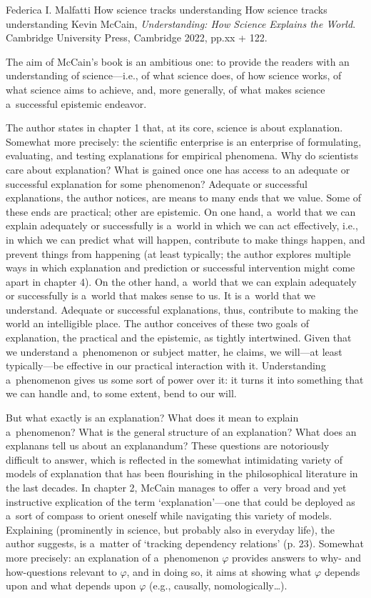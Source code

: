 \begin{recengenv}{Federica I. Malfatti}
	{How science tracks understanding}
	{How science tracks understanding}
	{Kevin McCain, \textit{Understanding: How Science Explains the World}. Cambridge University Press, Cambridge 2022, pp.xx + 122.}



\noindent The aim of McCain's book is an ambitious one: to provide the readers with an understanding of science---i.e., of what science does, of how science works, of what science aims to achieve, and, more generally, of what makes science a~successful epistemic endeavor.

The author states in chapter 1 that, at its core, science is about explanation. Somewhat more precisely: the scientific enterprise is an enterprise of formulating, evaluating, and testing explanations for empirical phenomena. Why do scientists care about explanation? What is gained once one has access to an adequate or successful explanation for some phenomenon? Adequate or successful explanations, the author notices, are means to many ends that we value. Some of these ends are practical; other are epistemic. On one hand, a~world that we can explain adequately or successfully is a~world in which we can act effectively, i.e., in which we can predict what will happen, contribute to make things happen, and prevent things from happening (at least typically; the author explores multiple ways in which explanation and prediction or successful intervention might come apart in chapter 4). On the other hand, a~world that we can explain adequately or successfully is a~world that makes sense to us. It is a~world that we understand. Adequate or successful explanations, thus, contribute to making the world an intelligible place. The author conceives of these two goals of explanation, the practical and the epistemic, as tightly intertwined. Given that we understand a~phenomenon or subject matter, he claims, we will---at least typically---be effective in our practical interaction with it. Understanding a~phenomenon gives us some sort of power over it: it turns it into something that we can handle and, to some extent, bend to our will.
\enlargethispage{1.5\baselineskip}

But what exactly is an explanation? What does it mean to explain a~phenomenon? What is the general structure of an explanation? What does an explanans tell us about an explanandum? These questions are notoriously difficult to answer, which is reflected in the somewhat intimidating variety of models of explanation that has been flourishing in the philosophical literature in the last decades. In chapter 2, McCain manages to offer a~very broad and yet instructive explication of the term ‘explanation'---one that could be deployed as a~sort of compass to orient oneself while navigating this variety of models. Explaining (prominently in science, but probably also in everyday life), the author suggests, is a~matter of ‘tracking dependency relations' (p. 23). Somewhat more precisely: an explanation of a~phenomenon $\varphi$ provides answers to why- and how-questions relevant to $\varphi$, and in doing so, it aims at showing what $\varphi$ depends upon and what depends upon $\varphi$ (e.g., causally, nomologically…).


\end{recengenv}
